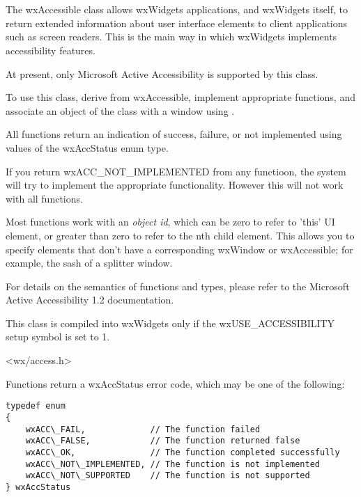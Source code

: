 %
%

\section{}\label{wxaccessible}

The wxAccessible class allows wxWidgets applications, and
wxWidgets itself, to return extended information about user interface elements
to client applications such as screen readers. This is the
main way in which wxWidgets implements accessibility features.

At present, only Microsoft Active Accessibility is supported
by this class.

To use this class, derive from wxAccessible, implement appropriate
functions, and associate an object of the class with a
window using .

All functions return an indication of success, failure, or not implemented
using values of the wxAccStatus enum type.

If you return wxACC\_NOT\_IMPLEMENTED from any functioon, the system will try to
implement the appropriate functionality. However this will not work with
all functions.

Most functions work with an {\it object id}, which can be zero to refer to
'this' UI element, or greater than zero to refer to the nth child element.
This allows you to specify elements that don't have a corresponding wxWindow or
wxAccessible; for example, the sash of a splitter window.

For details on the semantics of functions and types, please refer to the
Microsoft Active Accessibility 1.2 documentation.

This class is compiled into wxWidgets only if the wxUSE\_ACCESSIBILITY setup
symbol is set to 1.




<wx/access.h>


Functions return a wxAccStatus error code, which
may be one of the following:

{\small \begin{verbatim}
typedef enum
{
    wxACC\_FAIL,             // The function failed
    wxACC\_FALSE,            // The function returned false
    wxACC\_OK,               // The function completed successfully
    wxACC\_NOT\_IMPLEMENTED, // The function is not implemented
    wxACC\_NOT\_SUPPORTED    // The function is not supported
} wxAccStatus
\end{verbatim}}

